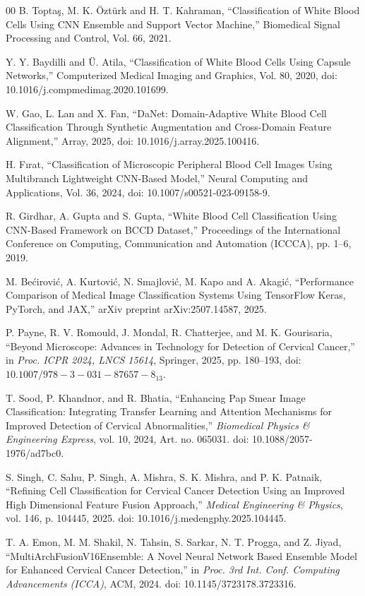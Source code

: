\documentclass[preprint,12pt]{elsarticle}
\begin{document}
\begin{thebibliography}{00}
B. Toptaş, M. K. Öztürk and H. T. Kahraman,
``Classification of White Blood Cells Using CNN Ensemble and Support Vector Machine,''
Biomedical Signal Processing and Control,
Vol. 66, 2021.

Y. Y. Baydilli and Ü. Atila,
``Classification of White Blood Cells Using Capsule Networks,''
Computerized Medical Imaging and Graphics,
Vol. 80, 2020, doi: 10.1016/j.compmedimag.2020.101699.

W. Gao, L. Lan and X. Fan,
``DaNet: Domain-Adaptive White Blood Cell Classification Through Synthetic Augmentation and Cross-Domain Feature Alignment,''
Array,
2025, doi: 10.1016/j.array.2025.100416.

H. Fırat,
``Classification of Microscopic Peripheral Blood Cell Images Using Multibranch Lightweight CNN-Based Model,''
Neural Computing and Applications,
Vol. 36, 2024, doi: 10.1007/s00521-023-09158-9.

R. Girdhar, A. Gupta and S. Gupta,
``White Blood Cell Classification Using CNN-Based Framework on BCCD Dataset,''
Proceedings of the International Conference on Computing, Communication and Automation (ICCCA),
pp. 1--6, 2019.

M. Bećirović, A. Kurtović, N. Smajlović, M. Kapo and A. Akagić,
``Performance Comparison of Medical Image Classification Systems Using TensorFlow Keras, PyTorch, and JAX,''
arXiv preprint arXiv:2507.14587, 2025.

P. Payne, R. V. Romould, J. Mondal, R. Chatterjee, and M. K. Gourisaria,
``Beyond Microscope: Advances in Technology for Detection of Cervical Cancer,''
in \textit{Proc. ICPR 2024, LNCS 15614}, Springer, 2025, pp. 180--193,
doi: $10.1007/978-3-031-87657-8_13$.


T. Sood, P. Khandnor, and R. Bhatia,
``Enhancing Pap Smear Image Classification: Integrating Transfer Learning and Attention Mechanisms for Improved Detection of Cervical Abnormalities,''
\textit{Biomedical Physics \& Engineering Express}, vol. 10, 2024, Art. no. 065031.
doi: 10.1088/2057-1976/ad7bc0.


S. Singh, C. Sahu, P. Singh, A. Mishra, S. K. Mishra, and P. K. Patnaik,
``Refining Cell Classification for Cervical Cancer Detection Using an Improved High Dimensional Feature Fusion Approach,''
\textit{Medical Engineering \& Physics}, vol. 146, p. 104445, 2025.
doi: 10.1016/j.medengphy.2025.104445.


T. A. Emon, M. M. Shakil, N. Tahsin, S. Sarkar, N. T. Progga, and Z. Jiyad,
``MultiArchFusionV16Ensemble: A Novel Neural Network Based Ensemble Model for Enhanced Cervical Cancer Detection,''
in \textit{Proc. 3rd Int. Conf. Computing Advancements (ICCA)}, ACM, 2024.
doi: 10.1145/3723178.3723316.



\end{thebibliography}
\end{document}
